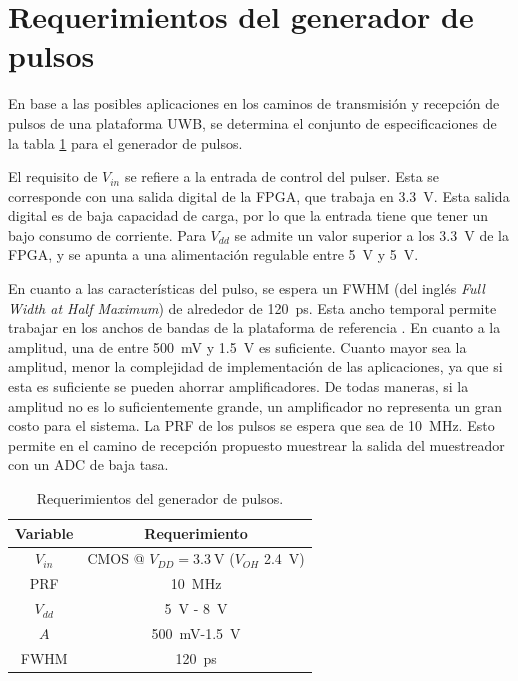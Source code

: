 \section{Requerimientos del generador de pulsos}

En base a las posibles aplicaciones en los caminos de transmisión y recepción de
pulsos de una plataforma UWB, se determina el conjunto de
especificaciones de la tabla \ref{tab:pulser_requirements} para el generador de
pulsos.

El requisito de $V_{in}$ se refiere a la entrada de control del pulser. Esta se
corresponde con una salida digital de la FPGA, que trabaja en \qty{3.3}{\volt}.
Esta salida digital es de baja capacidad de carga, por lo que la entrada tiene
que tener un bajo consumo de corriente. Para $V_{dd}$ se admite un valor
superior a los \qty{3.3}{\volt} de la FPGA, y se apunta a una alimentación
regulable entre \qty{5}{\volt} y \qty{5}{\volt}.

En cuanto a las características del pulso, se espera un FWHM (del inglés
\textit{Full Width at Half Maximum}) de alrededor de \qty{120}{\pico\second}.
Esta ancho temporal permite trabajar en los anchos de bandas de la plataforma
de referencia \cite{Altieri2021}. En cuanto a la amplitud, una de entre
\qty{500}{\milli\volt} y \qty{1.5}{\volt} es suficiente. Cuanto mayor sea la
amplitud, menor la complejidad de implementación de las aplicaciones, ya que si
esta es suficiente se pueden ahorrar amplificadores. De todas maneras, si la
amplitud no es lo suficientemente grande, un amplificador no representa un gran
costo para el sistema. La PRF de los pulsos se espera que sea de
\qty{10}{\mega\hertz}. Esto permite en el camino de recepción propuesto
muestrear la salida del muestreador con un ADC de baja tasa.

\begin{table}
\centering
\begin{tabular}{c|c}
\hline
    Variable & Requerimiento \\
\hline
    $V_{in}$                &   CMOS @ $V_{DD}=\qty{3.3}{\volt}$ ($V_{OH}$
    \qty{2.4}{\volt})     \\
    PRF                &        \qty{10}{\mega\hertz} \\
    $V_{dd}$                &   \qty{5}{\volt} - \qty{8}{\volt} \\
    $A$                &        \qty{500}{\milli\volt}-\qty{1.5}{\volt} \\
    FWHM                &       \qty{120}{\pico\second} \\
\hline
\end{tabular}
\caption{Requerimientos del generador de pulsos.}
\label{tab:pulser_requirements}
\end{table}
